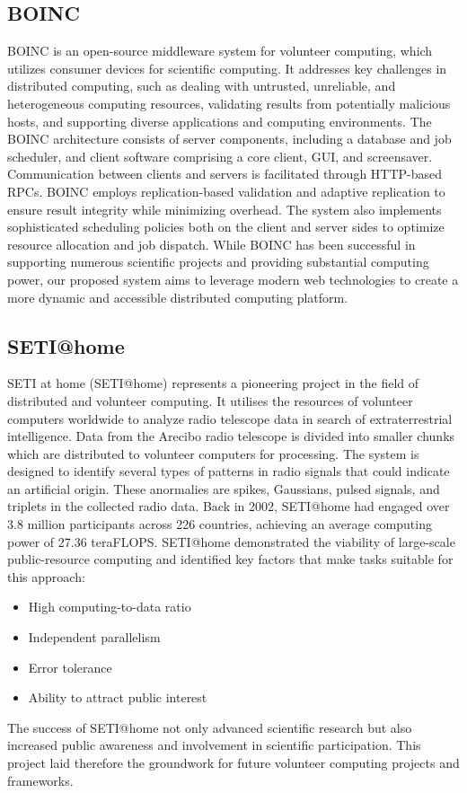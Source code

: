 \subsection{BOINC}
\label{subsec:background:related_work:boinc}
\ac{BOINC} is an open-source middleware system for volunteer computing, which utilizes consumer devices for scientific computing. It addresses key challenges in distributed computing, such as dealing with untrusted, unreliable, and heterogeneous computing resources, validating results from potentially malicious hosts, and supporting diverse applications and computing environments.
The BOINC architecture consists of server components, including a database and job scheduler, and client software comprising a core client, GUI, and screensaver. Communication between clients and servers is facilitated through HTTP-based RPCs. BOINC employs replication-based validation and adaptive replication to ensure result integrity while minimizing overhead. The system also implements sophisticated scheduling policies both on the client and server sides to optimize resource allocation and job dispatch.
While BOINC has been successful in supporting numerous scientific projects and providing substantial computing power, our proposed system aims to leverage modern web technologies to create a more dynamic and accessible distributed computing platform. \cite{relatedwork:boinc1}
\subsection{SETI@home}
\label{subsec:background:related_work:seti}
\ac{SETI} at home (SETI@home) represents a pioneering project in the field of distributed and volunteer computing. It utilises the resources of volunteer computers worldwide to analyze radio telescope data in search of extraterrestrial intelligence. Data from the Arecibo radio telescope is divided into smaller chunks which are distributed to volunteer computers for processing. The system is designed to identify several types of patterns in radio signals that could indicate an artificial origin. These anormalies are spikes, Gaussians, pulsed signals, and triplets in the collected radio data.
Back in 2002, \ac{SETI}@home had engaged over 3.8 million participants across 226 countries, achieving an average computing power of 27.36 teraFLOPS.
\ac{SETI}@home demonstrated the viability of large-scale public-resource computing and identified key factors that make tasks suitable for this approach:
\begin{itemize}
\item High computing-to-data ratio
\item Independent parallelism
\item Error tolerance
\item Ability to attract public interest
\end{itemize}
The success of \ac{SETI}@home not only advanced scientific research but also increased public awareness and involvement in scientific participation. This project laid therefore the groundwork for future volunteer computing projects and frameworks. \cite{relatedwork:seti}
